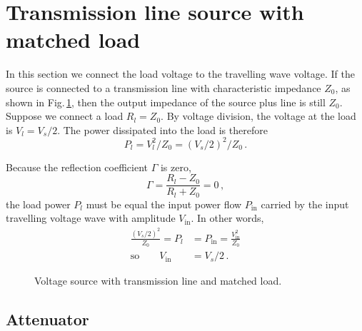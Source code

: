 \documentclass[twocolumn]{article}
\begin{document}
\section{Transmission line source with matched load}

In this section we connect the load voltage to the travelling wave voltage.
If the source is connected to a transmission line with characteristic impedance $Z_0$, as shown in Fig.\,\ref{fig:tline_matched_load}, then the output impedance of the source plus line is still $Z_0$.
Suppose we connect a load $R_l=Z_0$.
By voltage division, the voltage at the load is $V_l = V_s/2$.
The power dissipated into the load is therefore
\begin{equation}
P_l = V_l^2/Z_0 = (V_s/2)^2 / Z_0 \, .
\end{equation}

Because the reflection coefficient $\Gamma$ is zero,
\begin{equation}
\Gamma = \frac{R_l - Z_0}{R_l + Z_0} = 0 \, ,
\end{equation}
the load power $P_l$ must be equal the input power flow $P_{\text{in}}$ carried by the input travelling voltage wave with amplitude $V_{\text{in}}$.
In other words,
\begin{align}
\frac{(V_s/2)^2}{Z_0} = P_l &= P_{\text{in}} = \frac{V_{\text{in}}^2}{Z_0} \\
\text{so} \qquad V_{\text{in}} &= V_s/2 \, .
\end{align}

\begin{figure}
\begin{centering}
\par\end{centering}
\caption{Voltage source with transmission line and matched load.}
\label{fig:tline_matched_load}
\end{figure}

\subsection{Attenuator}
\end{document}
